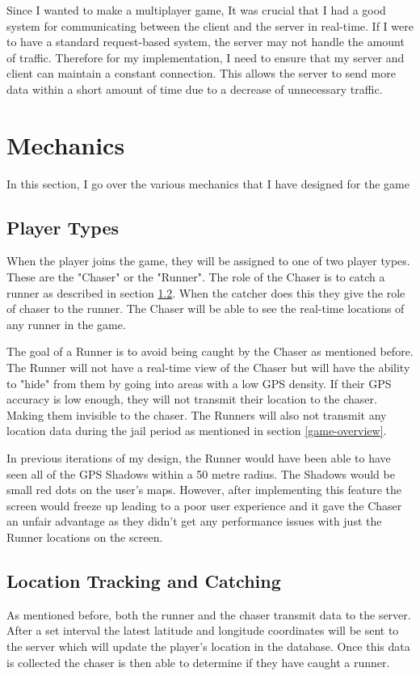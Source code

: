 \documentclass{l4proj}
\begin{document}
Since I wanted to make a multiplayer game, It was crucial that I had a good system for communicating between the client and the server
in real-time. If I were to have a standard request-based system, the server may not handle the amount of traffic. Therefore for my implementation,
I need to ensure that my server and client can maintain a constant connection. This allows the server to send more data within a short amount of
time due to a decrease of unnecessary traffic.
\section{Mechanics}
In this section, I go over the various mechanics that I have designed for the game

\subsection{Player Types}
When the player joins the game, they will be assigned to one of two player types. These are the "Chaser" or the "Runner".
The role of the Chaser is to catch a runner as described in section \ref{catching}. When the catcher does this they give the role of chaser to the runner. The Chaser
will be able to see the real-time locations of any runner in the game.

The goal of a Runner is to avoid being caught by the Chaser as mentioned before. The Runner will not have a real-time
view of the Chaser but will have the ability to "hide" from them by going into areas with a low GPS density. If their
GPS accuracy is low enough, they will not transmit their location to the chaser. Making them invisible to the chaser.
The Runners will also not transmit any location data during the jail period as mentioned in section \ref{game-overview}.

In previous iterations of my design, the Runner would have been able to have seen all of the GPS Shadows within a 50
metre radius. The Shadows would be small red dots on the user's maps. However, after implementing this feature the screen
would freeze up leading to a poor user experience and it gave the Chaser an unfair advantage as they didn't get any
performance issues with just the Runner locations on the screen.

\subsection{Location Tracking and Catching}
\label{catching}
As mentioned before, both the runner and the chaser transmit data to the server. After a set interval
the latest latitude and longitude coordinates will be sent to the server which will update the player's location
in the database. Once this data is collected the chaser is then able to determine if they have caught a runner.
\end{document}
